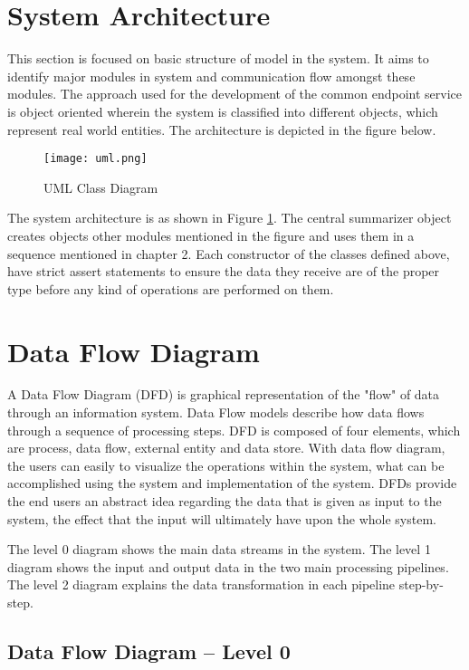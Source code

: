 \section{System Architecture}
This section is focused on basic structure of model in the system. It aims to identify major modules in system and communication flow amongst these modules. The approach used for the development of the common endpoint service is object oriented wherein the system is classified into different objects, which represent real world entities. The architecture is depicted in the figure below.

\begin{figure}[H]
    \centering
    \texttt{[image: uml.png]}
    \caption{UML Class Diagram}
    \label{img:uml}
\end{figure}

The system architecture is as shown in Figure \ref{img:uml}. The central summarizer object creates objects other modules mentioned in the figure and uses them in a sequence mentioned in chapter 2. Each constructor of the classes defined above, have strict assert statements to ensure the data they receive are of the proper type before any kind of operations are performed on them.

\section{Data Flow Diagram}

A Data Flow Diagram (DFD) is graphical representation of the "flow" of data through an information system. Data Flow models describe how data flows through a sequence of processing steps. DFD is composed of four elements, which are process, data flow, external entity and data store. With data flow diagram, the users can easily to visualize the operations within the system, what can be accomplished using the system and implementation of the system. DFDs provide the end users an abstract idea regarding the data that is given as input to the system, the effect that the input will ultimately have upon the whole system.

The level 0 diagram shows the main data streams in the system. The level 1 diagram shows the input and output data in the two main processing pipelines. The level 2 diagram explains the data transformation in each pipeline step-by-step.

    \subsection{Data Flow Diagram – Level 0}

